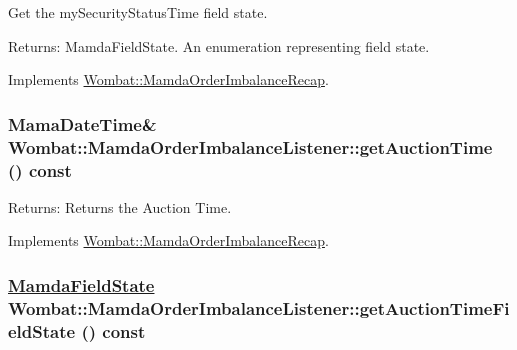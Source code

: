 Get the my\-Security\-Status\-Time field state. 

\begin{Desc}
\item[Returns:]Mamda\-Field\-State. An enumeration representing field state. \end{Desc}


Implements \hyperlink{classWombat_1_1MamdaOrderImbalanceRecap_57f208148935324b7c942a10f8591433}{Wombat::Mamda\-Order\-Imbalance\-Recap}.\hypertarget{classWombat_1_1MamdaOrderImbalanceListener_ce6a5772582fd4c526fbce36f1edee13}{
\subsubsection[getAuctionTime]{\setlength{\rightskip}{0pt plus 5cm}Mama\-Date\-Time\& Wombat::Mamda\-Order\-Imbalance\-Listener::get\-Auction\-Time () const}}
\label{classWombat_1_1MamdaOrderImbalanceListener_ce6a5772582fd4c526fbce36f1edee13}


\begin{Desc}
\item[Returns:]Returns the Auction Time. \end{Desc}


Implements \hyperlink{classWombat_1_1MamdaOrderImbalanceRecap_55fb46c69e5aff98475169a4ddbb4ae6}{Wombat::Mamda\-Order\-Imbalance\-Recap}.\hypertarget{classWombat_1_1MamdaOrderImbalanceListener_34beab82ba1bcb31a0a67df3fd9fa4bd}{
\subsubsection[getAuctionTimeFieldState]{\setlength{\rightskip}{0pt plus 5cm}\hyperlink{namespaceWombat_93aac974f2ab713554fd12a1fa3b7d2a}{Mamda\-Field\-State} Wombat::Mamda\-Order\-Imbalance\-Listener::get\-Auction\-Time\-Field\-State () const}}
\label{classWombat_1_1MamdaOrderImbalanceListener_34beab82ba1bcb31a0a67df3fd9fa4bd}


